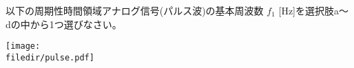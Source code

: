 以下の周期性時間領域アナログ信号(パルス波)の基本周波数 $f_1$ [Hz]を選択肢a〜dの中から1つ選びなさい。

\centering\texttt{[image: \\filedir/pulse.pdf]}
